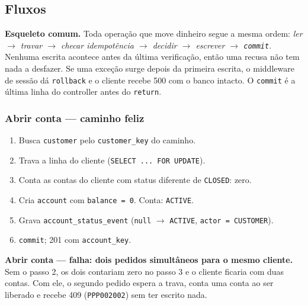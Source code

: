 \documentclass[11pt,a4paper]{article}
\newcommand{\tb}[1]{\texttt{#1}}
\begin{document}
\subsection*{Fluxos}

\textbf{Esqueleto comum.} Toda operação que move dinheiro segue a mesma ordem:
\emph{ler $\to$ travar $\to$ checar idempotência $\to$ decidir $\to$ escrever $\to$ \tb{commit}}.
Nenhuma escrita acontece antes da última verificação, então uma recusa não tem nada a desfazer.
Se uma exceção surge depois da primeira escrita, o middleware de sessão dá \tb{rollback} e o
cliente recebe 500 com o banco intacto. O \tb{commit} é a última linha do controller antes do
\tb{return}.

\subsubsection*{Abrir conta --- caminho feliz}
\begin{enumerate}
  \item Busca \tb{customer} pelo \tb{customer_key} do caminho.
  \item Trava a linha do cliente (\tb{SELECT ... FOR UPDATE}).
  \item Conta as contas do cliente com status diferente de \tb{CLOSED}: zero.
  \item Cria \tb{account} com \tb{balance = 0}. Conta: \tb{ACTIVE}.
  \item Grava \tb{account_status_event} (\tb{null} $\to$ \tb{ACTIVE}, \tb{actor = CUSTOMER}).
  \item \tb{commit}; 201 com \tb{account_key}.
\end{enumerate}

\textbf{Abrir conta --- falha: dois pedidos simultâneos para o mesmo cliente.} Sem o passo 2, os dois
contariam zero no passo 3 e o cliente ficaria com duas contas. Com ele, o segundo pedido espera a
trava, conta uma conta ao ser liberado e recebe 409 (\tb{PPP002002}) sem ter escrito nada.

\end{document}
